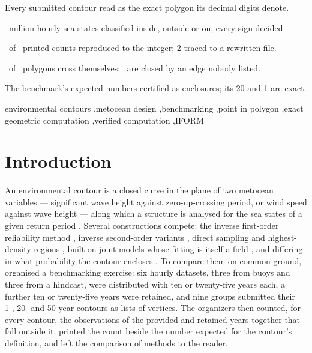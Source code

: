 \documentclass[preprint,11pt,authoryear]{elsarticle}
\begin{document}
\begin{frontmatter}
\begin{highlights}
\item Every submitted contour read as the exact polygon its decimal digits denote.
\item \EHoursTotalMillions\ million hourly sea states classified inside, outside or on, every sign decided.
\item \EExact\ of \EComparisons\ printed counts reproduced to the integer; 2 traced to a rewritten file.
\item \ENotSimple\ of \EContours\ polygons cross themselves; \ENotClosed\ are closed by an edge nobody listed.
\item The benchmark's expected numbers certified as enclosures; its 20 and 1 are exact.
\end{highlights}

\begin{keyword}
environmental contours \sep metocean design \sep benchmarking \sep point in polygon \sep exact geometric computation \sep verified computation \sep IFORM
\end{keyword}

\end{frontmatter}

\section{Introduction}\label{sec:intro}

An environmental contour is a closed curve in the plane of two metocean variables --- significant wave height against zero-up-crossing period, or wind speed against wave height --- along which a structure is analysed for the sea states of a given return period \citep{winterstein1993,dnv2021,iso19901}. Several constructions compete: the inverse first-order reliability method \citep{winterstein1993}, inverse second-order variants \citep{chai2018}, direct sampling \citep{huseby2013} and highest-density regions \citep{haselsteiner2017}, built on joint models whose fitting is itself a field \citep{jonathan2013,ross2020}, and differing in what probability the contour encloses \citep{mackay2021}. To compare them on common ground, \citet{haselsteiner2021} organised a benchmarking exercise: six hourly datasets, three from buoys and three from a hindcast, were distributed with ten or twenty-five years each, a further ten or twenty-five years were retained, and nine groups submitted their 1-, 20- and 50-year contours as lists of vertices. The organizers then counted, for every contour, the observations of the provided and retained years together that fall outside it, printed the count beside the number expected for the contour's definition, and left the comparison of methods to the reader.
\end{document}
